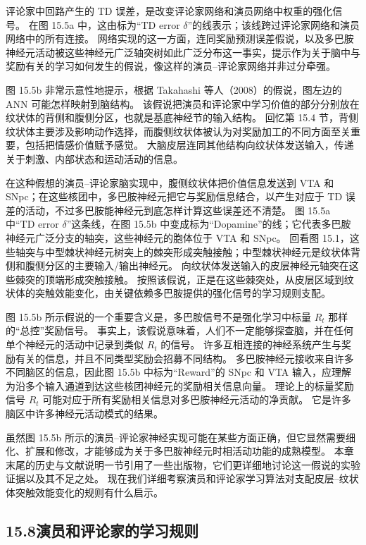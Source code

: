 \documentclass[UTF8,12pt,a4paper,fontset=fandol]{ctexart}
\begin{document}
评论家中回路产生的 TD 误差，是改变评论家网络和演员网络中权重的强化信号。
在图 15.5a 中，这由标为“TD error $\delta$”的线表示；该线跨过评论家网络和演员网络中的所有连接。
网络实现的这一方面，连同奖励预测误差假说，以及多巴胺神经元活动被这些神经元广泛轴突树如此广泛分布这一事实，提示作为关于脑中与奖励有关的学习如何发生的假说，像这样的演员--评论家网络并非过分牵强。

图 15.5b 非常示意性地提示，根据 Takahashi 等人（2008）的假说，图左边的 ANN 可能怎样映射到脑结构。
该假说把演员和评论家中学习价值的部分分别放在纹状体的背侧和腹侧分区，也就是基底神经节的输入结构。
回忆第 15.4 节，背侧纹状体主要涉及影响动作选择，而腹侧纹状体被认为对奖励加工的不同方面至关重要，包括把情感价值赋予感觉。
大脑皮层连同其他结构向纹状体发送输入，传递关于刺激、内部状态和运动活动的信息。

在这种假想的演员--评论家脑实现中，腹侧纹状体把价值信息发送到 VTA 和 SNpc；在这些核团中，多巴胺神经元把它与奖励信息结合，以产生对应于 TD 误差的活动，不过多巴胺能神经元到底怎样计算这些误差还不清楚。
图 15.5a 中“TD error $\delta$”这条线，在图 15.5b 中变成标为“Dopamine”的线；它代表多巴胺神经元广泛分支的轴突，这些神经元的胞体位于 VTA 和 SNpc。
回看图 15.1，这些轴突与中型棘状神经元树突上的棘突形成突触接触；中型棘状神经元是纹状体背侧和腹侧分区的主要输入/输出神经元。
向纹状体发送输入的皮层神经元轴突在这些棘突的顶端形成突触接触。
按照该假说，正是在这些棘突处，从皮层区域到纹状体的突触效能变化，由关键依赖多巴胺提供的强化信号的学习规则支配。

图 15.5b 所示假说的一个重要含义是，多巴胺信号不是强化学习中标量 $R_t$ 那样的“总控”奖励信号。
事实上，该假说意味着，人们不一定能够探查脑，并在任何单个神经元的活动中记录到类似 $R_t$ 的信号。
许多互相连接的神经系统产生与奖励有关的信息，并且不同类型奖励会招募不同结构。
多巴胺神经元接收来自许多不同脑区的信息，因此图 15.5b 中标为“Reward”的 SNpc 和 VTA 输入，应理解为沿多个输入通道到达这些核团神经元的奖励相关信息向量。
理论上的标量奖励信号 $R_t$ 可能对应于所有奖励相关信息对多巴胺神经元活动的净贡献。
它是许多脑区中许多神经元活动模式的结果。

虽然图 15.5b 所示的演员--评论家神经实现可能在某些方面正确，但它显然需要细化、扩展和修改，才能够成为关于多巴胺神经元时相活动功能的成熟模型。
本章末尾的历史与文献说明一节引用了一些出版物，它们更详细地讨论这一假说的实验证据以及其不足之处。
现在我们详细考察演员和评论家学习算法对支配皮层--纹状体突触效能变化的规则有什么启示。

\subsection*{15.8\quad 演员和评论家的学习规则}
\end{document}
